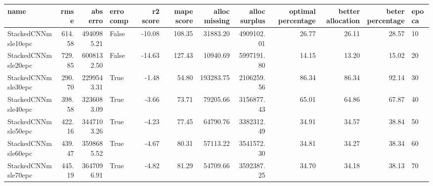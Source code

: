 \begin{tabular}{lrrlrrrrrrrl}
\toprule
name & rmse & abs erro & erro comp & r2 score & mape score & alloc missing & alloc surplus & optimal percentage & better allocation & beter percentage & epoca \\
\midrule
StackedCNNmsle10epc & 614.58 & 4940985.21 & False & -10.08 & 108.35 & 31883.20 & 4909102.01 & 26.77 & 26.11 & 28.57 & 10 \\
StackedCNNmsle20epc & 729.85 & 6008132.50 & False & -14.63 & 127.43 & 10940.69 & 5997191.80 & 14.15 & 13.20 & 15.02 & 20 \\
StackedCNNmsle30epc & 290.70 & 2299543.31 & True & -1.48 & 54.80 & 193283.75 & 2106259.56 & 86.34 & 86.34 & 92.14 & 30 \\
StackedCNNmsle40epc & 398.58 & 3236083.09 & True & -3.66 & 73.71 & 79205.66 & 3156877.43 & 65.01 & 64.86 & 67.87 & 40 \\
StackedCNNmsle50epc & 422.16 & 3447103.26 & True & -4.23 & 77.45 & 64790.76 & 3382312.49 & 34.91 & 34.57 & 38.84 & 50 \\
StackedCNNmsle60epc & 439.47 & 3598685.52 & True & -4.67 & 80.31 & 57113.22 & 3541572.30 & 34.81 & 34.27 & 38.34 & 60 \\
StackedCNNmsle70epc & 445.19 & 3647096.91 & True & -4.82 & 81.29 & 54709.66 & 3592387.25 & 34.70 & 34.18 & 38.13 & 70 \\
\bottomrule
\end{tabular}

